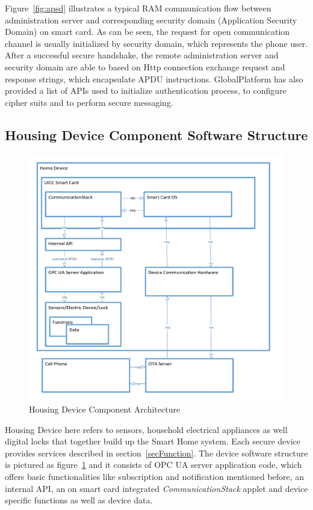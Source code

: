 Figure~\ref{fig:apsd} illustrates a typical RAM communication flow between administration server and corresponding security domain (Application Security Domain) on smart card. As can be seen, the request for open communication channel is usually initialized by security domain, which represents the phone user. After a successful secure handshake, the remote administration server and security domain are able to based on Http connection exchange request and response strings, which encapsulate APDU instructions. GlobalPlatform has also provided  a list of APIs used to initialize authentication process, to configure cipher suits and to perform secure messaging.

\subsection{Housing Device Component Software Structure}

\begin{figure}[!htb]
	\centering
	\includegraphics[width=1\textwidth]{serverStructure}
		\caption{Housing Device Component Architecture}
	\label{fig:serverStructure}
\end{figure}
Housing Device here refers to sensors, household electrical appliances as well digital locks that together build up the Smart Home system. Each secure device provides services described in section~\ref{secFunction}. The device software structure is pictured as figure~\ref{fig:serverStructure} and it consists of OPC UA server application code, which offers basic functionalities like subscription and notification mentioned before, an internal API, an on smart card integrated \emph{CommunicationStack} applet and device specific functions as well as device data.

